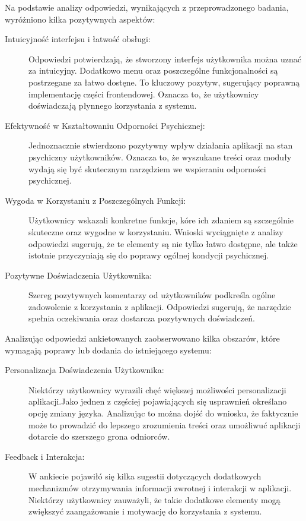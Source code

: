 Na podstawie analizy odpowiedzi, wynikających z przeprowadzonego badania,
wyróżniono kilka pozytywnych aspektów:

\begin{description}
    \item[Intuicyjność interfejsu i łatwość obsługi:] Odpowiedzi potwierdzają,
    że stworzony interfejs użytkownika można uznać za intuicyjny. Dodatkowo menu
    oraz poszczególne funkcjonalności są postrzegane za łatwo dostęne. To
    kluczowy pozytyw, sugerujący poprawną implementację części frontendowej.
    Oznacza to, że użytkownicy doświadczają płynnego korzystania z systemu.
    \item[Efektywność w Kształtowaniu Odporności Psychicznej:]Jednoznacznie
    stwierdzono pozytywny wpływ działania aplikacji na stan psychiczny
    użytkowników. Oznacza to, że wyszukane treści oraz moduły wydają się być
    skutecznym narzędziem we wspieraniu odporności psychicznej.
    \item[Wygoda w Korzystaniu z Poszczególnych Funkcji:] Użytkownicy wskazali
    konkretne funkcje, kóre ich zdaniem są szczególnie skuteczne oraz wygodne w
    korzystaniu. Wnioski wyciągnięte z analizy odpowiedzi sugerują, że te
    elementy są nie tylko łatwo dostępne, ale także istotnie przyczyniają się do
    poprawy ogólnej kondycji psychicznej.
    \item[Pozytywne Doświadczenia Użytkownika:]
    Szereg pozytywnych komentarzy od użytkowników podkreśla ogólne zadowolenie z
    korzystania z aplikacji. Odpowiedzi sugerują, że narzędzie spełnia
    oczekiwania oraz dostarcza pozytywnych doświadczeń.
\end{description}

Analizując odpowiedzi ankietowanych zaobserwowano kilka obszarów, które wymagają
poprawy lub dodania do istniejącego systemu:
\begin{description}
    \item[Personalizacja Doświadczenia Użytkownika:] Niektórzy użytkownicy
    wyrazili chęć większej możliwości personalizacji aplikacji.Jako jednen z
    częściej pojawiających się usprawnień określano opcję zmiany języka.
    Analizując to można dojść do wniosku, że faktycznie może to prowadzić do
    lepszego zrozumienia treści oraz umożliwuć aplikacji dotarcie do szerszego
    grona odniorców.
\item[Feedback i Interakcja:]
    W ankiecie pojawiłó się kilka sugestii dotyczących dodatkowych mechanizmów
    otrzymywania informacji zwrotnej i interakcji w aplikacji. Niektórzy
    użytkownicy zauważyli, że takie dodatkowe elementy mogą zwiększyć
    zaangażowanie i motywację do korzystania z systemu.
\end{description}

